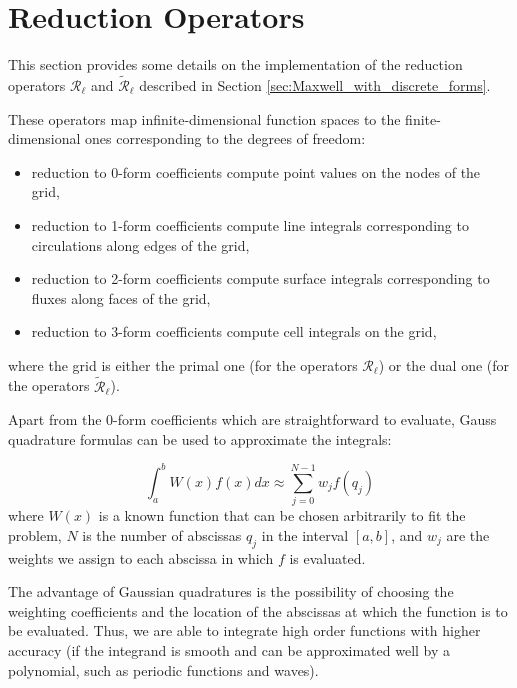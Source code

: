 \documentclass[11pt]{article}
\begin{document}
\section{Reduction Operators}

This section provides some details on the implementation of the reduction operators 
$\mathcal{R}_{\ell}$ and $\tilde{\mathcal{R}}_{\ell}$ 
described in Section \ref{sec:Maxwell_with_discrete_forms}.



These operators map infinite-dimensional function spaces to the finite-dimensional ones 
corresponding to the degrees of freedom:
\begin{itemize}
    \item reduction to 0-form coefficients compute point values on the nodes of the grid,
    \item reduction to 1-form coefficients compute line integrals corresponding to circulations along edges of the grid,
    \item reduction to 2-form coefficients compute surface integrals corresponding to fluxes along faces of the grid,
    \item reduction to 3-form coefficients compute cell integrals on the grid,
\end{itemize}
where the grid is either the primal one (for the operators $\mathcal{R}_{\ell}$) 
or the dual one (for the operators $\tilde{\mathcal{R}}_{\ell}$).

Apart from the 0-form coefficients which are straightforward to evaluate, 
Gauss quadrature formulas can be used to approximate the integrals: 

\begin{equation}
    \int_ a ^ b W(x) f(x) dx \approx \sum_{j=0}^{N-1} w_j f(q_j)
\end{equation}
%
where $W(x)$ is a known function that can be chosen arbitrarily to fit the problem, $N$ is the number of abscissas $q_j$ in the interval $\left[a, b\right]$, and $w_j$ are the weights we assign to each abscissa in which $f$ is evaluated.

The advantage of Gaussian quadratures is the possibility of choosing the weighting coefficients and the location of the abscissas at which the function is to be evaluated. Thus, we are able to integrate high order functions with higher accuracy (if the integrand is smooth and can be approximated well by a polynomial, such as periodic functions and waves).
\end{document}
